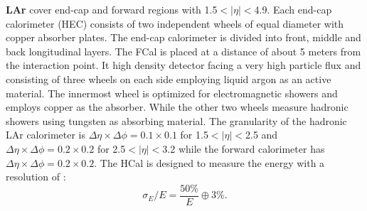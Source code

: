  \textbf{LAr} cover end-cap and forward regions with 1.5$<|\eta|<$4.9. Each end-cap calorimeter (HEC) consists of two independent wheels of equal diameter with copper absorber plates. The end-cap calorimeter is divided into front, middle and back longitudinal layers. The FCal is placed at a distance of about 5 meters from the interaction point. It high density detector facing a very high particle flux and consisting of three wheels on each side employing liquid argon as an active material. The innermost wheel is optimized for electromagnetic showers and employs copper as the absorber. While the other two wheels measure hadronic showers using tungsten as absorbing material. The granularity of the hadronic LAr calorimeter is $\Delta\eta\times\Delta\phi= 0.1\times0.1$ for 1.5$<|\eta|<$2.5 and $\Delta\eta\times\Delta\phi= 0.2\times0.2$ for 2.5$<|\eta|<$3.2 while the forward calorimeter has $\Delta\eta\times\Delta\phi= 0.2\times0.2$. 
 The HCal is designed to measure the energy with a resolution of \cite{Tile_Perf}:
 \begin{equation}
     \sigma_E/E = \frac{50\%}{E} \oplus 3\%.
 \end{equation}

